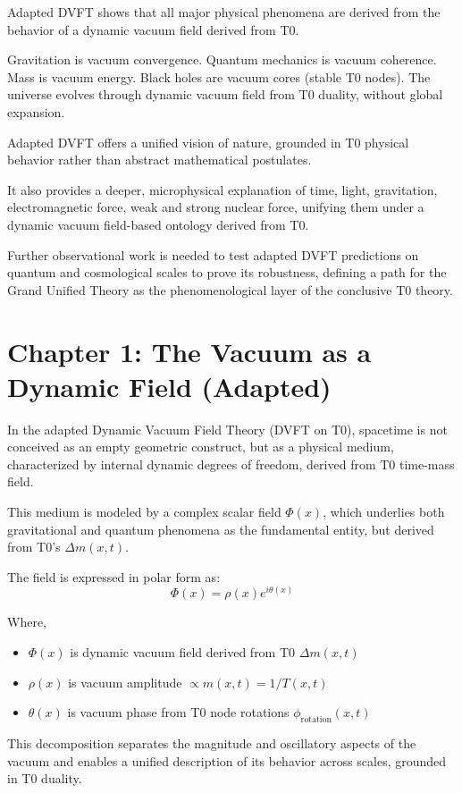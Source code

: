 	Adapted DVFT shows that all major physical phenomena are derived from the behavior of a dynamic vacuum field derived from T0.
	
	Gravitation is vacuum convergence.
	Quantum mechanics is vacuum coherence.
	Mass is vacuum energy.
	Black holes are vacuum cores (stable T0 nodes).
	The universe evolves through dynamic vacuum field from T0 duality, without global expansion.
	
	Adapted DVFT offers a unified vision of nature, grounded in T0 physical behavior rather than abstract mathematical postulates.
	
	It also provides a deeper, microphysical explanation of time, light, gravitation, electromagnetic force, weak and strong nuclear force, unifying them under a dynamic vacuum field-based ontology derived from T0.
	
	Further observational work is needed to test adapted DVFT predictions on quantum and cosmological scales to prove its robustness, defining a path for the Grand Unified Theory as the phenomenological layer of the conclusive T0 theory.
	
	\section{Chapter 1: The Vacuum as a Dynamic Field (Adapted)}
	
	In the adapted Dynamic Vacuum Field Theory (DVFT on T0), spacetime is not conceived as an empty geometric construct, but as a physical medium, characterized by internal dynamic degrees of freedom, derived from T0 time-mass field.
	
	This medium is modeled by a complex scalar field $\Phi(x)$, which underlies both gravitational and quantum phenomena as the fundamental entity, but derived from T0's $\Delta m(x,t)$.
	
	The field is expressed in polar form as:
	\[
	\Phi(x)=\rho(x)e^{i\theta(x)}
	\]
	
	Where,
	\begin{itemize}
		\item $\Phi(x)$ is dynamic vacuum field derived from T0 $\Delta m(x,t)$
		\item $\rho(x)$ is vacuum amplitude $\propto m(x,t) = 1/T(x,t)$
		\item $\theta(x)$ is vacuum phase from T0 node rotations $\phi_{\text{rotation}}(x,t)$
	\end{itemize}
	
	This decomposition separates the magnitude and oscillatory aspects of the vacuum and enables a unified description of its behavior across scales, grounded in T0 duality.
	
